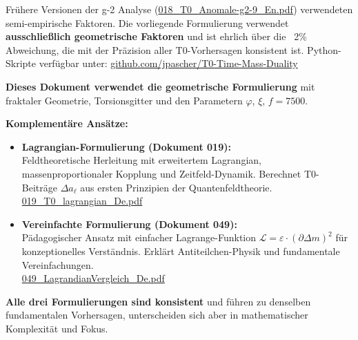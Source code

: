 	
	\begin{tcolorbox}[colback=yellow!10!white, colframe=orange!75!black, title=Hinweis zu älteren Dokumenten]
		Frühere Versionen der g-2 Analyse (\href{https://github.com/jpascher/T0-Time-Mass-Duality/blob/main/2/pdf/018_T0_Anomale-g2-9_En.pdf}{018\_T0\_Anomale-g2-9\_En.pdf}) verwendeten semi-empirische Faktoren. Die vorliegende Formulierung verwendet \textbf{ausschließlich geometrische Faktoren} und ist ehrlich über die ~2\% Abweichung, die mit der Präzision aller T0-Vorhersagen konsistent ist. Python-Skripte verfügbar unter: \href{https://github.com/jpascher/T0-Time-Mass-Duality/blob/main/2/python/}{github.com/jpascher/T0-Time-Mass-Duality}
	\end{tcolorbox}
	
	\begin{tcolorbox}[colback=blue!10!white, colframe=blue!75!black, title=Alternative Formulierungen der T0-Theorie]
		\textbf{Dieses Dokument verwendet die geometrische Formulierung} mit fraktaler Geometrie, Torsionsgitter und den Parametern $\varphi$, $\xi$, $f = 7500$.
		
		\textbf{Komplementäre Ansätze:}
		\begin{itemize}
			\item \textbf{Lagrangian-Formulierung (Dokument 019):} \\
			Feldtheoretische Herleitung mit erweitertem Lagrangian, massenproportionaler Kopplung und Zeitfeld-Dynamik. Berechnet T0-Beiträge $\Delta a_\ell$ aus ersten Prinzipien der Quantenfeldtheorie. \\
			\rightarrow \href{https://github.com/jpascher/T0-Time-Mass-Duality/blob/main/2/pdf/019_T0_lagrangian_De.pdf}{019\_T0\_lagrangian\_De.pdf}
			
			\item \textbf{Vereinfachte Formulierung (Dokument 049):} \\
			Pädagogischer Ansatz mit einfacher Lagrange-Funktion $\mathcal{L} = \varepsilon \cdot (\partial \Delta m)^2$ für konzeptionelles Verständnis. Erklärt Antiteilchen-Physik und fundamentale Vereinfachungen. \\
			\rightarrow \href{https://github.com/jpascher/T0-Time-Mass-Duality/blob/main/2/pdf/049_LagrandianVergleich_De.pdf}{049\_LagrandianVergleich\_De.pdf}
		\end{itemize}
		
		\textbf{Alle drei Formulierungen sind konsistent} und führen zu denselben fundamentalen Vorhersagen, unterscheiden sich aber in mathematischer Komplexität und Fokus.
	\end{tcolorbox}
	
